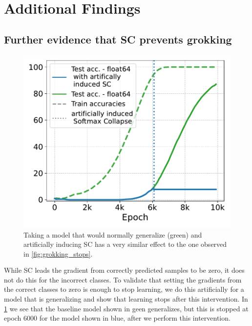 \section{Additional Findings}\label{app:additional_findings}


\subsection{Further evidence that SC prevents grokking} \label{app:sc_intervention}
\begin{figure}
            \vspace{-0.4cm}
            \begin{center}
    \includegraphics[width=\linewidth]{grokking_iclr_arxiv/figures/artificially_induced_sc.pdf}
            \end{center}
            \vspace{-12pt}
            \caption{Taking a model that would normally generalize (green) and artificially inducing SC has a very similar effect to the one observed in \cref{fig:grokking_stops}.\vspace{4mm}}
    \label{fig:sc_intervention}
\end{figure} 
While SC leads the gradient from correctly predicted samples to be zero, it does not do this for the incorrect classes. To validate that setting the gradients from the correct classes to zero is enough to stop learning, we do this artificially for a model that is generalizing and show that learning stops after this intervention. In \cref{fig:sc_intervention} we see that the baseline model shown in geen generalizes, but this is stopped at epoch 6000 for the model shown in blue, after we perform this intervention.


